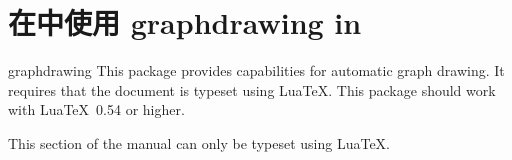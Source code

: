 %
%
%


\section{在\tikzname 中使用 graphdrawing in \tikzname}

{}

\begin{tikzlibrary}{graphdrawing}
    This package provides capabilities for automatic graph drawing. It requires
    that the document is typeset using Lua\TeX. This package should work with
    Lua\TeX\ 0.54 or higher.
\end{tikzlibrary}

\ifluatex
\else
    This section of the manual can only be typeset using Lua\TeX.
    \expandafter\endinput
\fi


\subsection{Choosing a Layout and a Library}

The graph drawing engine is initialized when you load the library
|graphdrawing|. This library provides the basic framework for graph drawing,
including all options and keys described in the present section. However, this
library does \emph{not} load any actual algorithms for drawing graphs. For
this, you need to use the following command, which is defined by the
|graphdrawing| library:

